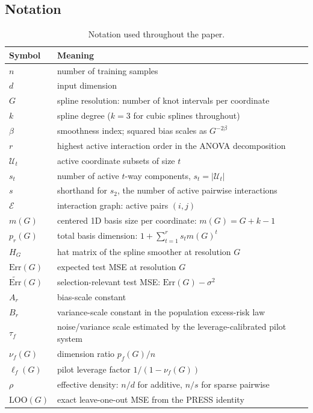\documentclass{article}
\newcommand{\Err}{\mathrm{Err}}
\newcommand{\LoO}{\mathrm{LOO}}
\begin{document}
\subsection{Notation}

\begin{table}[h]
\caption{Notation used throughout the paper.}
\label{tab:notation}
\centering
\small
\begin{tabular}{@{}ll@{}}
\toprule
Symbol & Meaning \\
\midrule
$n$ & number of training samples \\
$d$ & input dimension \\
$G$ & spline resolution: number of knot intervals per coordinate \\
$k$ & spline degree ($k=3$ for cubic splines throughout) \\
$\beta$ & smoothness index; squared bias scales as $G^{-2\beta}$ \\
$r$ & highest active interaction order in the ANOVA decomposition \\
$\mathcal{U}_t$ & active coordinate subsets of size $t$ \\
$s_t$ & number of active $t$-way components, $s_t=|\mathcal{U}_t|$ \\
$s$ & shorthand for $s_2$, the number of active pairwise interactions \\
$\mathcal{E}$ & interaction graph: active pairs $(i,j)$ \\
$m(G)$ & centered 1D basis size per coordinate: $m(G)=G+k-1$ \\
$p_r(G)$ & total basis dimension: $1+\sum_{t=1}^r s_t m(G)^t$ \\
$H_G$ & hat matrix of the spline smoother at resolution $G$ \\
$\Err(G)$ & expected test MSE at resolution $G$ \\
$\widetilde{\Err}(G)$ & selection-relevant test MSE: $\Err(G)-\sigma^2$ \\
$A_r$ & bias-scale constant \\
$B_r$ & variance-scale constant in the population excess-risk law \\
$\tau_f$ & noise/variance scale estimated by the leverage-calibrated pilot system \\
$\nu_f(G)$ & dimension ratio $p_f(G)/n$ \\
$\ell_f(G)$ & pilot leverage factor $1/(1-\nu_f(G))$ \\
$\rho$ & effective density: $n/d$ for additive, $n/s$ for sparse pairwise \\
$\LoO(G)$ & exact leave-one-out MSE from the PRESS identity \\
\bottomrule
\end{tabular}
\end{table}
\end{document}

